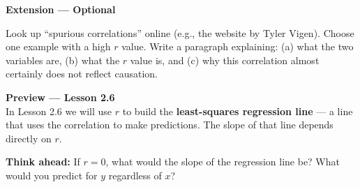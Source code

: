 \documentclass[10pt]{article}
\begin{document}
\vspace{0.18in}

\begin{extensionbox}
\small\textbf{Extension --- Optional}

Look up ``spurious correlations'' online (e.g., the website by Tyler Vigen). Choose one example
with a high $r$ value. Write a paragraph explaining: (a) what the two variables are,
(b) what the $r$ value is, and (c) why this correlation almost certainly does not reflect causation.
\end{extensionbox}

\vspace{0.14in}

\begin{tcolorbox}[colback=greenbg, colframe=greenacc, boxrule=0.8pt, arc=2mm,
    left=4mm, right=4mm, top=3mm, bottom=3mm]
\small\textbf{Preview --- Lesson 2.6}\\[4pt]
In Lesson 2.6 we will use $r$ to build the \textbf{least-squares regression line} --- a line
that uses the correlation to make predictions. The slope of that line depends directly on $r$.

\vspace{4pt}
\textbf{Think ahead:} If $r = 0$, what would the slope of the regression line be? What
would you predict for $y$ regardless of $x$?\\[6pt]
\writeline\\[2pt]\writeline
\end{tcolorbox}
\end{document}
